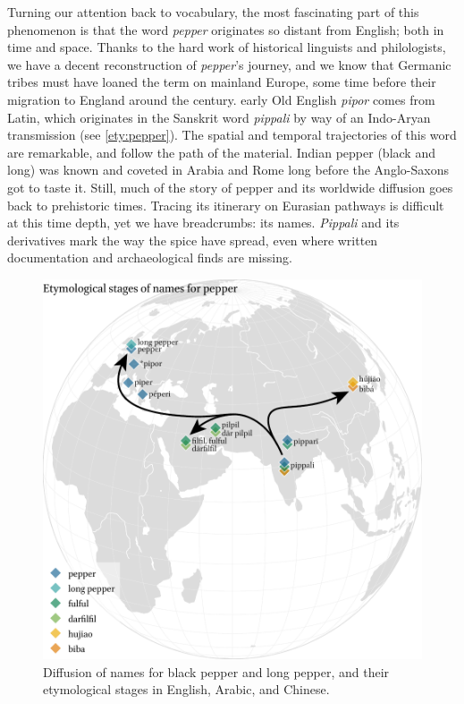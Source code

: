 Turning our attention back to vocabulary, the most fascinating part of this phenomenon is that the word \textit{pepper} originates so distant from English; both in time and space. Thanks to the hard work of historical linguists and philologists, we have a decent reconstruction of \textit{pepper}'s journey, and we know that Germanic tribes must have loaned the term on mainland Europe, some time before their migration to England around the  century. early Old English \textit{pipor} comes from Latin, which originates in the Sanskrit word \textit{pippali} by way of an Indo-Aryan transmission (see \ref{ety:pepper}). The spatial and temporal trajectories of this word are remarkable, and follow the path of the material. Indian pepper (black and long) was known and coveted in Arabia and Rome long before the Anglo-Saxons got to taste it. Still, much of the story of pepper and its worldwide diffusion goes back to prehistoric times. Tracing its itinerary on Eurasian pathways is difficult at this time depth, yet we have breadcrumbs: its names. \textit{Pippali} and its derivatives mark the way the spice have spread, even where written documentation and archaeological finds are missing.

\begin{figure}[!ht]
    \centering
    \includegraphics[width=\linewidth]{imgs/plots/diffusion_pepper_edited.pdf}
    \caption[Diffusion of names for pepper, and their etymological stages.]{Diffusion of names for black pepper and long pepper, and their etymological stages in English, Arabic, and Chinese.}
    \label{fig:diffusion_pepper}
\end{figure}


